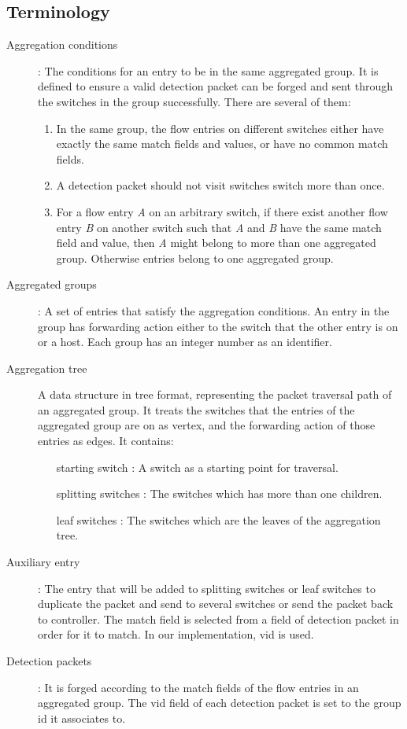 \subsection{Terminology}

\begin{description}%

\item
[Aggregation conditions]:
The conditions for an entry to be in the same aggregated group. It is defined to ensure a valid detection packet can be forged and sent through the switches in the group successfully. There are several of them:
\begin{enumerate}[label={\arabic*)}]
\item
In the same group, the flow entries on different switches either have exactly the same match fields and values, or have no common match fields.
\item
A detection packet should not visit switches switch more than once.
\item
For a flow entry \textit{A} on an arbitrary switch, if there exist another flow entry \textit{B} on another switch such that \textit{A} and \textit{B} have the same match field and value, then \textit{A} might belong to more than one aggregated group. Otherwise entries belong to one aggregated group.

\end{enumerate}

\item
[Aggregated groups]: 
A set of entries that satisfy the aggregation conditions. An entry in the group has forwarding action either to the switch that the other entry is on or a host. Each group has an integer number as an identifier.

\item 
[Aggregation tree]
A data structure in tree format, representing the packet traversal path of an aggregated group. It treats the switches that the entries of the aggregated group are on as vertex, and the forwarding action of those entries as edges. It contains:
\begin{enumerate}
\item
[starting switch]:
A switch as a starting point for traversal.
\item
[splitting switches]:
The switches which has more than one children. 
\item
[leaf switches]:
The switches which are the leaves of the aggregation tree.
\end{enumerate}
\item 
[Auxiliary entry]:
The entry that will be added to splitting switches or leaf switches to duplicate the packet and send to several switches or send the packet back to controller. The match field is selected from a field of detection packet in order for it to match. In our implementation, vid is used.

\item
[Detection packets]:
It is forged according to the match fields of the flow entries in an aggregated group. The vid field of each detection packet is set to the group id it associates to.
\end{description}


